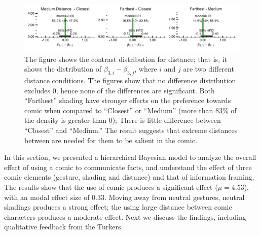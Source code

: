 \begin{figure}
 \includegraphics[width=\textwidth]{./hari-code/factors_distance_contrasts_main-noint.pdf}
 \caption{The figure shows the contrast distribution for distance; that is, it shows the distribution of $\beta_{3,i} - \beta_{3,j}$, where $i$ and $j$ are two different distance conditions. The figures show that no difference distribution excludes $0$, hence none of the differences are significant. Both ``Farthest'' shading have stronger effects on the preference towards comic when compared to ``Closest''  or ``Medium'' (more than 83\% of the density is greater than 0); There is little difference between ``Closest'' and ``Medium.'' The result suggests that extreme distances between are needed for them to be salient in the comic.}
 \label{fig:distance-contrasts-main}
\end{figure}

In this section, we presented a hierarchical Bayesian model to analyze the overall effect of using a comic to communicate facts, and understand the effect of three comic elements (gesture, shading and distance) and that of information framing. The results show that the use of comic produces a significant effect ($\mu=4.53$), with an modal effect size of $0.33$. Moving away from neutral gestures, neutral shadings produces a strong effect; the using large distance between comic characters produces a moderate effect. Next we discuss the findings, including qualitative feedback from the Turkers.
